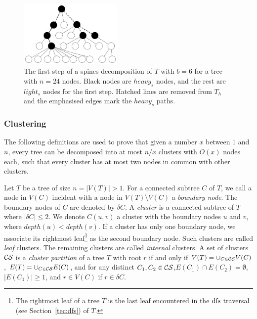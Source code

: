 				\begin{figure}[!ht]
				\centering
				\includegraphics[width=50mm]{./Figures/Ladder_decomp.pdf}
				\caption{The first step of a  spines decomposition  of $T$ with $b=6$ for a tree with $n=24$ nodes. Black nodes are $heavy_s$ nodes, and the rest are $light_s$ nodes for the first step. Hatched lines are removed from $T_h$  and the emphasised edges mark the $heavy_s$ paths.}
				\label{fig:ladder}
			\end{figure}
			 

\subsubsection{Clustering}\label{tec:clustering}
The following  definitions are used to prove  that given a number $x$ between $1$ and $n$, every tree can be decomposed into at most $n/x$ clusters with $O(x)$ nodes each, such that every cluster has at most two nodes in common with other clusters.

\begin{definition} \label{dfn:cluster}
Let $T$ be a tree of size $n = \vert V(T) \vert >1$.
 For a connected subtree $C$ of $T$, we call a node in $V(C)$ incident with a node in $V(T) \setminus V(C)$ a \emph{boundary node}.
The boundary nodes of $C$ are denoted by $\delta C$. 
A \emph{cluster} is a connected subtree of $T$ where $\vert \delta C \vert \leq 2$.
We denote $C(u,v)$ a cluster with the boundary nodes $u$ and $v$, where $depth(u)< depth(v)$.
If a cluster has only one boundary node, we associate  its rightmost leaf\footnote{The rightmost leaf of a tree $T$ is the last leaf encountered in the $\operatorname{dfs}$ traversal (see Section~\ref{tec:dfs}) of $T$.}  as the second boundary node.
Such clusters are called \emph{leaf} clusters. The remaining clusters are called \emph{internal} clusters.
 A set of clusters $ \mathcal{CS}$ is a \emph{cluster partition} of a tree $T$ with root $r$ if and only if $V(T) = \cup_{C \in  \mathcal{CS}}V(C)$, $E(T)= \cup_{C \in  \mathcal{CS}} E(C) $, and for any distinct $C_1,C_2 \in  \mathcal{CS}$,$E(C_1) \cap E(C_2) = \emptyset$,$\vert E(C_1) \vert \geq 1$, and $ r \in V(C)$ if $r \in \delta C$.
\end{definition}


